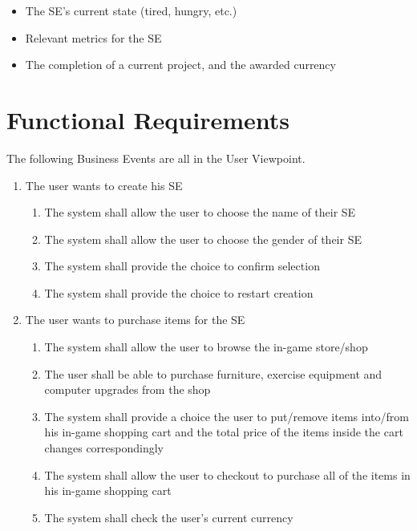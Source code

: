 \documentclass[]{article}
\begin{document}
\begin{itemize}
    \item The SE’s current state (tired, hungry, etc.)
    \item Relevant metrics for the SE
    \item The completion of a current project, and the awarded currency
\end{itemize}

\section{Functional Requirements}
\label{sec:functional_requirements}
The following Business Events are all in the User Viewpoint.


\begin{enumerate}[start=1, label={\textbf{BE\arabic*.}}]
	\item The user wants to create his SE
    \begin{enumerate}[1.]
        \item The system shall allow the user to choose the name of their SE
        \item The system shall allow the user to choose the gender of their SE
        \item The system shall provide the choice to confirm selection
        \item The system shall provide the choice to restart creation
    \end{enumerate}
    
	\item The user wants to purchase items for the SE
	\begin{enumerate}[1.]
		\item The system shall allow the user to browse the in-game store/shop
        \item The user shall be able to purchase furniture, exercise equipment 
        and computer upgrades from the shop
        \item The system shall provide a choice the user to put/remove items 
        into/from his in-game shopping cart and the total price of the items 
        inside the cart changes correspondingly
        \item The system shall allow the user to checkout to purchase all of 
        the items in his in-game shopping cart
        \item The system shall check the user’s current currency
    \end{enumerate}
    

\end{enumerate}
\end{document}
